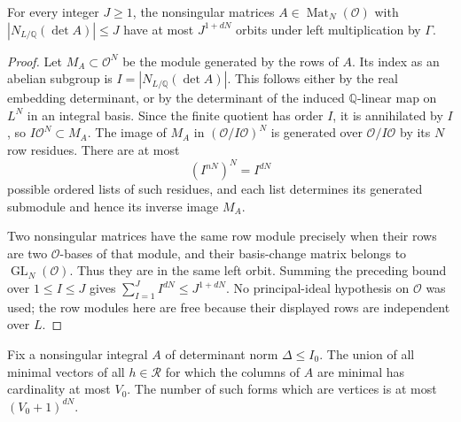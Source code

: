 \begin{proposition}
\label{prop:tb-row-module}
For every integer $J\ge1$, the nonsingular matrices
$A\in\operatorname{Mat}_N(\mathcal O)$ with
$|N_{L/\mathbb Q}(\det A)|\le J$ have at most $J^{1+dN}$
orbits under left multiplication by $\Gamma$.
\end{proposition}

\begin{proof}
Let $M_A\subset\mathcal O^N$ be the module generated by the rows
of $A$.  Its index as an abelian subgroup is
$I=|N_{L/\mathbb Q}(\det A)|$.  This follows either by the real
embedding determinant, or by the determinant of the induced
$\mathbb Q$-linear map on $L^N$ in an integral basis.
Since the finite quotient has order $I$, it is annihilated by $I$,
so $I\mathcal O^N\subset M_A$.  The image of $M_A$ in
$(\mathcal O/I\mathcal O)^N$ is generated over $\mathcal O/I\mathcal O$
by its $N$ row residues.  There are at most
\[
             (I^{nN})^N=I^{dN}
\]
possible ordered lists of such residues, and each list determines
its generated submodule and hence its inverse image $M_A$.

Two nonsingular matrices have the same row module precisely when
their rows are two $\mathcal O$-bases of that module, and their
basis-change matrix belongs to $\operatorname{GL}_N(\mathcal O)$.
Thus they are in the same left orbit.  Summing the preceding bound
over $1\le I\le J$ gives
$\sum_{I=1}^J I^{dN}\le J^{1+dN}$.  No principal-ideal hypothesis
on $\mathcal O$ was used; the row modules here are free because
their displayed rows are independent over $L$.
\end{proof}

\begin{proposition}
\label{prop:tb-near-count}
Fix a nonsingular integral $A$ of determinant norm
$\Delta\le I_0$.  The union of all minimal vectors of all
$h\in\mathcal R$ for which the columns of $A$ are minimal has
cardinality at most $V_0$.  The number of such forms which are
vertices is at most $(V_0+1)^{dN}$.
\end{proposition}

